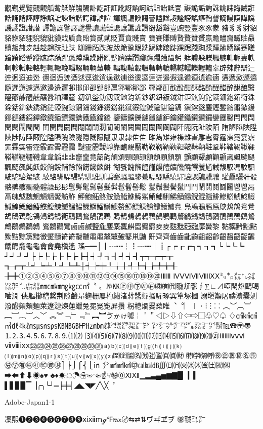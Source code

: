 覯覲覺覽覿觀觚觜觝觧觴觸訃訖訐訌訛訝訥訶詁詛詒詆詈
詼詭詬詢誅誂誄誨誡誑誥誦誚誣諄諍諂諚諫諳諧諤諱謔諠
諢諷諞諛謌謇謚諡謖謐謗謠謳鞫謦謫謾謨譁譌譏譎證譖譛
譚譫譟譬譯譴譽讀讌讎讒讓讖讙讚谺豁谿豈豌豎豐⾗豕豢
豬⾘豸豺貂貉貅貊貍貎貔豼貘戝貭貪貽貲貳貮貶賈賁賤賣
賚賽賺賻贄贅贊贇贏贍贐齎贓賍贔贖赧赭赱赳趁趙跂趾趺
跏跚跖跌跛跋跪跫跟跣跼踈踉跿踝踞踐踟蹂踵踰踴蹊蹇蹉
蹌蹐蹈蹙蹤蹠踪蹣蹕蹶蹲蹼躁躇躅躄躋躊躓躑躔躙躪躡躬
躰軆躱躾軅軈軋軛軣軼軻軫軾輊輅輕輒輙輓輜輟輛輌輦輳
輻輹轅轂輾轌轉轆轎轗轜轢轣轤辜辟辣辭辯辷迚迥迢迪迯
邇迴逅迹迺逑逕逡逍逞逖逋逧逶逵逹迸遏遐遑遒逎遉逾遖
遘遞遨遯遶隨遲邂遽邁邀邊邉邏邨邯邱邵郢郤扈郛鄂鄒鄙
鄲鄰酊酖酘酣酥酩酳酲醋醉醂醢醫醯醪醵醴醺釀釁釉釋釐
釖釟釡釛釼釵釶鈞釿鈔鈬鈕鈑鉞鉗鉅鉉鉤鉈銕鈿鉋鉐銜銖
銓銛鉚鋏銹銷鋩錏鋺鍄錮錙錢錚錣錺錵錻鍜鍠鍼鍮鍖鎰鎬
鎭鎔鎹鏖鏗鏨鏥鏘鏃鏝鏐鏈鏤鐚鐔鐓鐃鐇鐐鐶鐫鐵鐡鐺鑁
鑒鑄鑛鑠鑢鑞鑪鈩鑰鑵鑷鑽鑚鑼鑾钁鑿閂閇閊閔閖閘閙閠
閨閧閭閼閻閹閾闊濶闃闍闌闕闔闖關闡闥闢阡阨阮阯陂陌
陏陋陷陜陞陝陟陦陲陬隍隘隕隗險隧隱隲隰隴⾪隶隸⾫隹
雎雋雉雍襍雜霍雕雹霄霆霈霓霎霑霏霖霙霤霪霰霹霽霾靄
靆靈靂靉靜靠靤靦靨勒靫靱靹鞅靼鞁靺鞆鞋鞏鞐鞜鞨鞦鞣
鞳鞴韃韆韈⾱韋韜⾲韭齏韲竟韶韵頏頌頸頤頡頷頽顆顏顋
顫顯顰顱顴顳颪颯颱颶飄飃飆飩飫餃餉餒餔餘餡餝餞餤餠
餬餮餽餾饂饉饅饐饋饑饒饌饕馗馘馥馭馮馼駟駛駝駘駑駭
駮駱駲駻駸騁騏騅駢騙騫騷驅驂驀驃騾驕驍驛驗驟驢驥驤
驩驫驪骭骰骼髀髏髑髓體髞⾽髟髢髣髦髯髫髮髴髱髷髻鬆
鬘鬚鬟鬢鬣⾾鬥鬧鬨鬩鬪鬮⾿鬯鬲⿀魄魃魏魍魎魑魘魴鮓
鮃鮑鮖鮗鮟鮠鮨鮴鯀鯊鮹鯆鯏鯑鯒鯣鯢鯤鯔鯡鰺鯲鯱鯰鰕
鰔鰉鰓鰌鰆鰈鰒鰊鰄鰮鰛鰥鰤鰡鰰鱇鰲鱆鰾鱚鱠鱧鱶鱸鳧
鳬鳰鴉鴈鳫鴃鴆鴪鴦鶯鴣鴟鵄鴕鴒鵁鴿鴾鵆鵈鵝鵞鵤鵑鵐
鵙鵲鶉鶇鶫鵯鵺鶚鶤鶩鶲鷄鷁鶻鶸鶺鷆鷏鷂鷙鷓鷸鷦鷭鷯
鷽鸚鸛鸞⿄鹵鹹鹽麁麈麋麌麒麕麑麝⿆麥麩麸麪麭靡黌黎
黏黐黔黜點黝黠黥黨黯黴黶黷⿋黹黻黼⿌黽鼇鼈皷鼕鼡鼬
鼾齊⿑齒⿒齔齣齟齠齡齦齧齬齪齷齲齶龕龜⿔龠⿕堯槇遙
瑤─━│┃┄┅┆┇┈┉┊┋┌┍┎┏┐┑┒┓└┕┖┗
┘┙┚┛├┝┞┟┠┡┢┣┤┥┦┧┨┩┪┫┬┭┮┯┰
┱┲┳┴┵┶┷┸┹┺┻┼┽┾┿╀╁╂╃╄╅╆╇╈╉
╊╋①②③④⑤⑥⑦⑧⑨⑩⑪⑫⑬⑭⑮⑯⑰⑱⑲⑳ⅠⅡⅢ
ⅣⅤⅥⅦⅧⅨⅩ㍉㌔㍍㌧㌶㍑㌍㌦㌫㍊㎜㎝㎞㎎㎏㏄㎡〝
〟№㏍㊤㊥㊦㊧㊨㈱㈲㈹㍾㍽㍼∮∑∟⊿啞𨳝焰鷗喝嚙㵎
俠軀櫛𥡴繫荆𨻶鹼昻麴栅屢杓繡渚蔣醬蟬搔驒琢巽簞塚摑
溺塡顚屠禱瀆囊剝潑醱頻頰麵萊遼漣煉蓮蠟兔冕冤𡨚屛攢
柺梎𤏐爨蔾睢︑︒︳︱︲⁝︙⁚︰︵︶︹︺﹇﹈︷︸︿﹀
︽︾﹁﹂﹃﹄︻︼ゔゕゖ噓￤＇＂◁▷⇩⇧⇦⇨▢♧♡♤
♢㎠㎢㎤㎥㎗ℓ㎘㎳㎲㎱㎰㎅㎆㎇㏋㎐㏔㎖㌢㌖㌘㌕㌃㌣
㍗㍂㌹㌻㌀㌱㍇㌞㌪㍿℡☎〶〠⒈⒉⒊⒋⒌⒍⒎⒏⒐⑴⑵
⑶⑷⑸⑹⑺⑻⑼⑽⑾⑿⒀⒁⒂⒃⒄⒅⒆⒇㉑ⅰⅱⅲⅳⅴⅵ
ⅶⅷⅸⅹ㉒㉓㉔㉕㉖㉗㉘㉙㉚㉛⒜⒝⒞⒟⒠⒡⒢⒣⒤⒥⒦
⒧⒨⒩⒪⒫⒬⒭⒮⒯⒰⒱⒲⒳⒴⒵㉃㈽㈿㈴㈸㈳㈼㉂㈾㈶
㈵㈻㉀㈺㊰㊭㊩㊯㊔㊪㊘㊫㊒㊑㊓㊬㊮㊖⎫⎬⎭⎧⎨⎩㏌
㌅㎟㎣㎦㊞㎈㎉㏈∭㈰㈪㈫㈬㈭㈮㈯㈷㉁➡⬅⬆⬇◉♠♥
♣♦☀☁☂☃☞☜☝☟㊙⓪ⅪⅫ▁▂▃▄▅▆▇█▏▎▍
▌▋▊▉▔▕╭╮╰╯═╞╪╡◢◣◥◤╱╲╳︐

Adobe-Japan1-1

凜熙❶❷❸❹❺❻❼❽❾ⅺⅻⅿℊ℉℻〄⇆⇄⇅ヷヸヹヺ
㊝㍻㌳㍎


